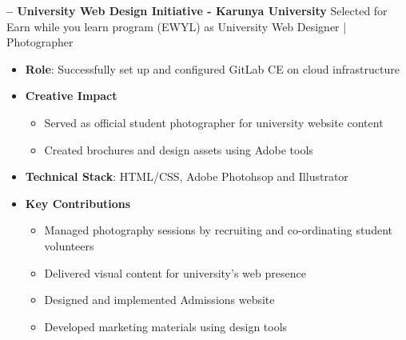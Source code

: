 \begin{sectionContainer}
	\vspace{0.4em}\noindent\large\textbf{– University Web Design Initiative - Karunya University}
	\vspace{0.8em} \newline
	Selected for Earn while you learn program (EWYL)  as University Web Designer | Photographer
	\begin{itemize}[leftmargin=*, nosep, itemsep=0.4em, before=\vspace{0.6em}, after=\vspace{0.8em}, label={}]
		\item \textbf{Role}: Successfully set up and configured GitLab CE on cloud infrastructure
		\item \textbf{Creative Impact}
		\begin{itemize}
			\item Served as official student photographer for university website content
			\item Created brochures and design assets using Adobe tools
		\end{itemize}
		\item \textbf{Technical Stack}: HTML/CSS, Adobe Photohsop and Illustrator
		\item \textbf{Key Contributions}
		\begin{itemize}
			\item Managed photography sessions by recruiting and co-ordinating student volunteers
			\item Delivered visual content for university's web presence
			\item Designed and implemented Admissions website
			\item Developed marketing materials using design tools
		\end{itemize}
	\end{itemize}
\end{sectionContainer}
\nopagebreak[4]